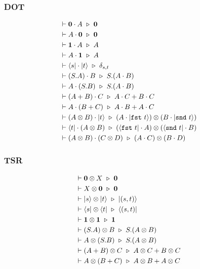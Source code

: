 \subsubsection*{\textsf{DOT}}
\begin{align*}
  & \vdash \mathbf{0} \cdot A \ \triangleright\  \mathbf{0} \\
  & \vdash A \cdot \mathbf{0} \ \triangleright\  \mathbf{0} \\
  & \vdash \textbf{1} \cdot A \ \triangleright\  A \\
  & \vdash A \cdot \textbf{1} \ \triangleright\  A \\
  & \vdash \langle s| \cdot |t\rangle \ \triangleright\  \delta_{s, t} \\
  & \vdash (S.A) \cdot B \ \triangleright\  S.(A \cdot B) \\
  & \vdash A \cdot (S.B) \ \triangleright\  S.(A \cdot B) \\
  & \vdash (A + B) \cdot C \ \triangleright\  A \cdot C + B \cdot C \\
  & \vdash A \cdot (B + C) \ \triangleright\  A \cdot B + A \cdot C \\
  & \vdash (A \otimes B) \cdot |t\rangle \ \triangleright\  (A \cdot |\texttt{fst}\ t\rangle) \otimes (B \cdot |\texttt{snd}\ t\rangle) \\
  & \vdash \langle t| \cdot (A \otimes B) \ \triangleright\  (\langle \texttt{fst}\ t| \cdot A) \otimes (\langle \texttt{snd}\ t| \cdot B) \\
  & \vdash (A \otimes B) \cdot (C \otimes D) \ \triangleright\  (A \cdot C) \otimes (B \cdot D)
\end{align*}


\subsubsection*{\textsf{TSR}}
\begin{align*}
  & \vdash \mathbf{0} \otimes X \ \triangleright\  \mathbf{0} \\
  & \vdash X \otimes \mathbf{0} \ \triangleright\  \mathbf{0} \\
  & \vdash |s\rangle \otimes |t\rangle\ \triangleright\  |(s, t)\rangle \\
  & \vdash \langle s| \otimes \langle t|\ \triangleright\  \langle (s, t)| \\
  & \vdash \mathbf{1} \otimes \mathbf{1} \ \triangleright\  \mathbf{1} \\
  & \vdash (S.A) \otimes B \ \triangleright\  S.(A \otimes B) \\
  & \vdash A \otimes (S.B) \ \triangleright\  S.(A \otimes B) \\
  & \vdash (A + B) \otimes C \ \triangleright\  A \otimes C + B \otimes C \\
  & \vdash A \otimes (B + C) \ \triangleright\  A \otimes B + A \otimes C
\end{align*}